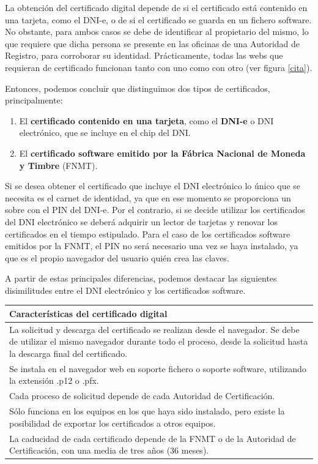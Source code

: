 \documentclass{manual}
\begin{document}
La obtención del certificado digital depende de si el certificado está contenido en una tarjeta, como el DNI-e, o de si el certificado se guarda en un fichero software. No obstante, para ambos casos se debe de identificar al propietario del mismo, lo que requiere que dicha persona se presente en las oficinas de una Autoridad de Registro, para corroborar su identidad. Prácticamente, todas las webs que requieran de certificado funcionan tanto con uno como con otro (ver figura \ref{cita}). 

Entonces, podemos concluir que distinguimos dos tipos de certificados, principalmente:

\begin{enumerate}
	\item El \textbf{certificado contenido en una tarjeta}, como el \textbf{DNI-e} o DNI electrónico, que se incluye en el chip del DNI.
	\item El \textbf{certificado software emitido por la Fábrica Nacional de Moneda y Timbre} (FNMT).
\end{enumerate}

Si se desea obtener el certificado que incluye el DNI electrónico lo único que se necesita es el carnet de identidad, ya que en ese momento se proporciona un sobre con el PIN del DNI-e. Por el contrario, si se decide utilizar los certificados del DNI electrónico se deberá adquirir un lector de tarjetas y renovar los certificados en el tiempo estipulado. Para el caso de los certificados software emitidos por la FNMT, el PIN no será necesario una vez se haya instalado, ya que es el propio navegador del usuario quién crea las claves. %

A partir de estas principales diferencias, podemos destacar las siguientes disimilitudes entre el DNI electrónico y los certificados software.



\begin{table}[H]
	\begin{tabular}{|m{14cm}|}
		\hline
		\textbf{Características del certificado digital} \\ \hline\hline
		La solicitud y descarga del certificado se realizan desde el navegador. Se debe de utilizar el mismo navegador durante todo el proceso, desde la solicitud hasta la descarga final del certificado. \\ \hline
		Se instala en el navegador web en soporte fichero o soporte software, utilizando la extensión .p12 o .pfx.\\ \hline
		Cada proceso de solicitud depende de cada Autoridad de Certificación.\\ \hline
		Sólo funciona en los equipos en los que haya sido instalado, pero existe la posibilidad de exportar los certificados a otros equipos.\\ \hline
		La caducidad de cada certificado depende de la FNMT o de la Autoridad de Certificación, con una media de tres años (36 meses).\\ \hline
	\end{tabular}
\end{table}
\end{document}
